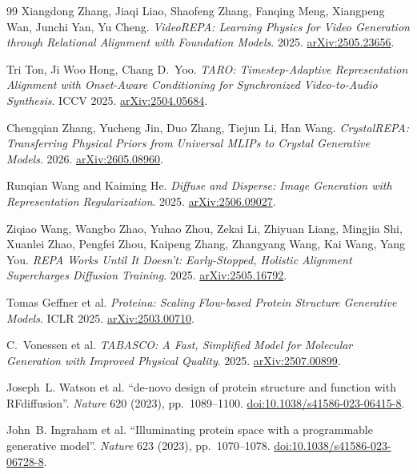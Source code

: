 \documentclass[12pt,a4paper,twoside]{report}
\begin{document}
\begin{thebibliography}{99}
Xiangdong Zhang, Jiaqi Liao, Shaofeng Zhang, Fanqing Meng, Xiangpeng Wan, Junchi Yan, Yu Cheng.
\textit{VideoREPA: Learning Physics for Video Generation through Relational Alignment with Foundation Models}. 2025.
\href{https://arxiv.org/abs/2505.23656}{arXiv:2505.23656}.

Tri Ton, Ji Woo Hong, Chang D.~Yoo.
\textit{TARO: Timestep-Adaptive Representation Alignment with Onset-Aware Conditioning for Synchronized Video-to-Audio Synthesis}. ICCV 2025.
\href{https://arxiv.org/abs/2504.05684}{arXiv:2504.05684}.

Chengqian Zhang, Yucheng Jin, Duo Zhang, Tiejun Li, Han Wang.
\textit{CrystalREPA: Transferring Physical Priors from Universal MLIPs to Crystal Generative Models}. 2026.
\href{https://arxiv.org/abs/2605.08960}{arXiv:2605.08960}.

Runqian Wang and Kaiming He.
\textit{Diffuse and Disperse: Image Generation with Representation Regularization}. 2025.
\href{https://arxiv.org/abs/2506.09027}{arXiv:2506.09027}.

Ziqiao Wang, Wangbo Zhao, Yuhao Zhou, Zekai Li, Zhiyuan Liang, Mingjia Shi, Xuanlei Zhao, Pengfei Zhou, Kaipeng Zhang, Zhangyang Wang, Kai Wang, Yang You.
\textit{REPA Works Until It Doesn't: Early-Stopped, Holistic Alignment Supercharges Diffusion Training}. 2025.
\href{https://arxiv.org/abs/2505.16792}{arXiv:2505.16792}.


Tomas Geffner et al.
\textit{Proteina: Scaling Flow-based Protein Structure Generative Models}. ICLR 2025.
\href{https://arxiv.org/abs/2503.00710}{arXiv:2503.00710}.

C.~Vonessen et al.
\textit{TABASCO: A Fast, Simplified Model for Molecular Generation with Improved Physical Quality}. 2025.
\href{https://arxiv.org/abs/2507.00899}{arXiv:2507.00899}.


Joseph~L. Watson et al.
``de-novo design of protein structure and function with RFdiffusion''.
\textit{Nature} 620 (2023), pp.~1089--1100.
\href{https://doi.org/10.1038/s41586-023-06415-8}{doi:10.1038/s41586-023-06415-8}.

John~B. Ingraham et al.
``Illuminating protein space with a programmable generative model''.
\textit{Nature} 623 (2023), pp.~1070--1078.
\href{https://doi.org/10.1038/s41586-023-06728-8}{doi:10.1038/s41586-023-06728-8}.


\end{thebibliography}
\end{document}
